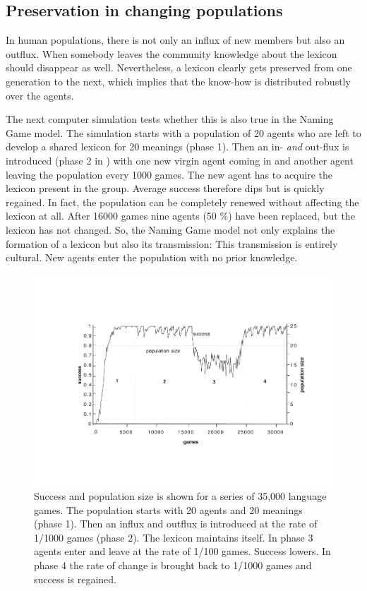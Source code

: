 \subsection{Preservation in changing populations}

In human populations, there is not only an influx of 
new members but also an outflux. When somebody leaves
the community knowledge about the lexicon should
disappear as well. Nevertheless, a lexicon clearly 
gets preserved from one generation to the next, which 
implies that the know-how is distributed robustly over
the agents.

The next computer simulation tests whether this is also true
in the Naming Game model. 
The simulation starts with a population of 20 agents who 
are left to develop a shared lexicon for 
20 meanings (phase 1). 
Then an in- {\itshape and} out-flux is introduced (phase 2 in 
) with one
new virgin agent coming in 
and another agent leaving the population every 1000 games. 
The new agent has to acquire the lexicon present in the group. 
Average success therefore dips but is quickly regained.
In fact, the population can be completely renewed without affecting the
lexicon at all. 
After 16000 games nine agents (50 \%) have been
replaced, but the lexicon has not changed. So, the Naming Game model
not only explains the formation of 
a lexicon but also its transmission: This transmission is 
entirely cultural. New agents enter the population with no 
prior knowledge. 


\begin{figure}[htbp]
  \centerline{\includegraphics[width=\textwidth]{chap5/figs/birth+death.pdf}}
\caption{\label{birth+death}Success and population size 
is shown for a series of 35,000 language games. 
The population starts with 20 agents and 20 
meanings (phase 1). Then an influx and outflux is introduced 
at the rate of 1/1000 games (phase 2). The lexicon
maintains itself. In phase 3 agents enter and leave at
the rate of 1/100 games. Success lowers. In phase 
4 the rate of change is brought back to 1/1000 games
and success is regained.}
\end{figure}

